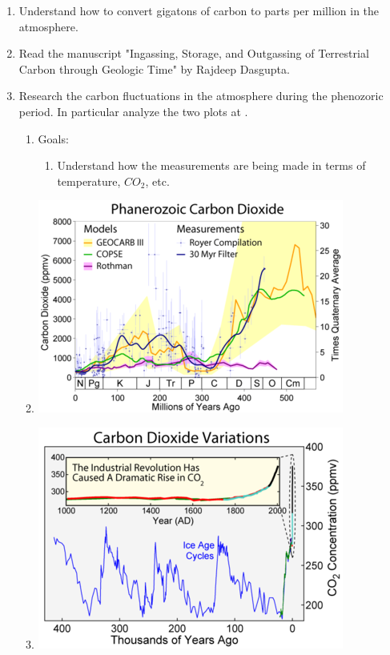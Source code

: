 \documentclass[final,10pt,reqno,twoside]{article}
\begin{document}
  \begin{enumerate}[leftmargin=0cm, align=left]






    \item \label{Prob:Item_01} Understand how to convert gigatons of carbon to parts per million in the atmosphere.
              		
    \item Read the manuscript "Ingassing, Storage, and Outgassing of Terrestrial Carbon through Geologic Time" by Rajdeep Dasgupta.

    \item Research the carbon fluctuations in the atmosphere during the phenozoric period. In particular analyze the two plots at .
         \begin{enumerate}[label=\textbf{(\alph*})]
           \item Goals: 
             \begin{enumerate}
               \item Understand how the measurements are being made in terms of temperature, $CO_2$, etc.
             \end{enumerate}
           \item \includegraphics{00FIGURES/Phanerozoic_Carbon_Dioxide.png}
           \item \includegraphics{00FIGURES/Carbon_Dioxide_400kyr.png}
         \end{enumerate} 
         

\end{enumerate}
\end{document}
